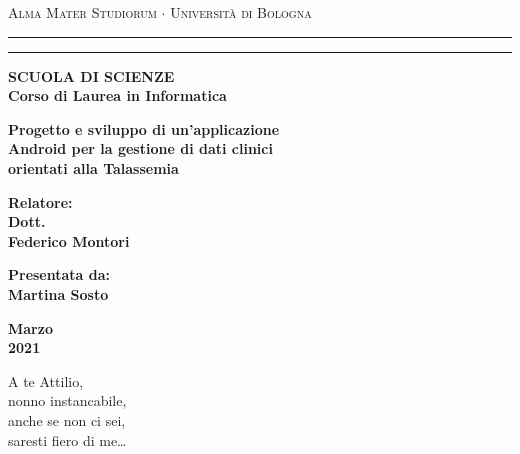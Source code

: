\documentclass[12pt,a4paper,openright,twoside]{report}
\begin{document}
\begin{titlepage}
\begin{center}
{{\Large{\textsc{Alma Mater Studiorum $\cdot$ Università di Bologna}}}} \rule[0.1cm]{13.5cm}{0.1mm}
\rule[0.5cm]{13.5cm}{0.6mm}
{\small{\bf SCUOLA DI SCIENZE\\
Corso di Laurea in Informatica }}
\end{center}
\vspace{15mm}
\begin{center}
{\LARGE{\bf Progetto e sviluppo di un'applicazione}}\\
\vspace{3mm}
{\LARGE{\bf Android per la gestione di dati clinici}}\\
\vspace{3mm}
{\LARGE{\bf orientati alla Talassemia}}\\
\end{center}
\vspace{40mm}
\par
\noindent
\begin{minipage}[t]{0.47\textwidth}
{\large{\bf Relatore:\\
Dott.\\
Federico Montori}}
\end{minipage}
\hfill
\begin{minipage}[t]{0.47\textwidth}\raggedleft
{\large{\bf Presentata da:\\
Martina Sosto}}
\end{minipage}
\vspace{20mm}
\begin{center}
{\large{\bf Marzo\\
2021 }}
\end{center}

\clearpage{\pagestyle{empty}\cleardoublepage}%
\end{titlepage}



\begin{titlepage}           
\thispagestyle{empty} %
\topmargin=6.5cm %
\raggedleft %
\large %
\em %


A te Attilio,\\
nonno instancabile, \\
anche se non ci sei, \\
saresti fiero di me\ldots                     
\newpage                               

\clearpage{\pagestyle{empty}\cleardoublepage}%
\end{titlepage}
\end{document}
